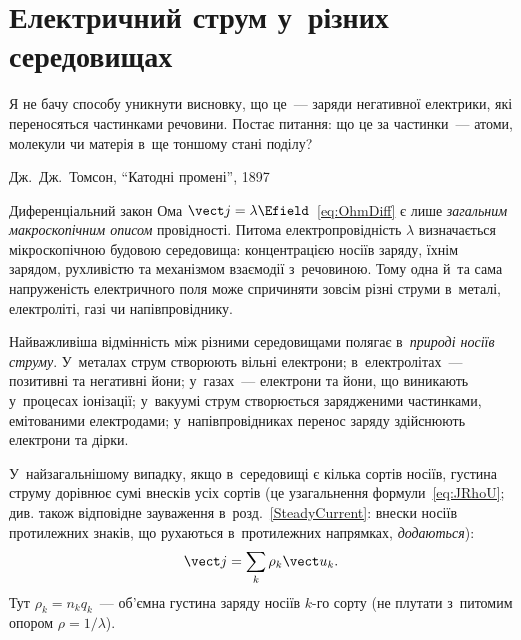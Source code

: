 
\chapter{Електричний струм у~різних середовищах}\label{\currfilebase}\hypertarget{\currfilebase}{}
\graphicspath{{\currfilebase/Pictures}}

\epigraph{\Alexander Я не бачу способу уникнути висновку, що це~--- заряди негативної
електрики, які переносяться частинками речовини. Постає питання: що це за частинки~---
атоми, молекули чи матерія в~ще тоншому стані поділу? }{Дж.~Дж.~Томсон, \enquote{Катодні
промені}, 1897}

Диференціальний закон Ома $\vect j = \lambda \Efield$~\eqref{eq:OhmDiff} є лише
\emph{загальним макроскопічним описом} провідності. Питома електропровідність $\lambda$
визначається мікроскопічною будовою середовища: концентрацією носіїв заряду, їхнім
зарядом, рухливістю та механізмом взаємодії з~речовиною. Тому одна й~та сама напруженість
електричного поля може спричиняти зовсім різні струми в~металі, електроліті, газі чи
напівпровіднику.

Найважливіша відмінність між різними середовищами полягає в~\emph{природі носіїв струму}.
У~металах струм створюють вільні електрони; в~електролітах~--- позитивні та негативні
йони; у~газах~--- електрони та йони, що виникають у~процесах іонізації; у~вакуумі струм
створюється зарядженими частинками, емітованими електродами; у~напівпровідниках перенос
заряду здійснюють електрони та дірки.

У~найзагальнішому випадку, якщо в~середовищі є кілька сортів носіїв, густина струму
дорівнює сумі внесків усіх сортів (це узагальнення формули~\eqref{eq:JRhoU}; див. також
відповідне зауваження в~розд.~\ref{SteadyCurrent}: внески носіїв протилежних знаків, що
рухаються в~протилежних напрямках, \emph{додаються}):
\begin{equation}\label{eq:GeneralCurrentMedia}
	\vect j = \sum_k \rho_k\vect u_k.
\end{equation}
Тут $\rho_k=n_kq_k$~--- об'ємна густина заряду носіїв $k$-го сорту (не плутати з~питомим
опором $\rho=1/\lambda$).


